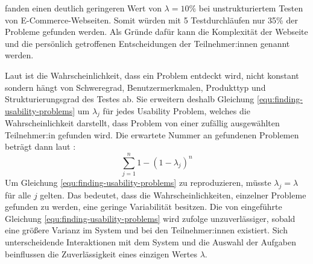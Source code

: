 \textcite{spoolTestingWeb2001} fanden einen deutlich geringeren Wert von $\lambda{}=10\%$ bei unstrukturiertem Testen von E-Commerce-Webseiten. Somit würden mit 5 Testdurchläufen nur 35\% der Probleme gefunden werden. Als Gründe dafür kann die Komplexität der Webseite und die persönlich getroffenen Entscheidungen der Teilnehmer:innen genannt werden.
\parencite{spoolTestingWeb2001}

Laut \textcite{woolrychWhyWhen2001} ist die Wahrscheinlichkeit, dass ein Problem entdeckt wird, nicht konstant sondern hängt von Schweregrad, Benutzermerkmalen, Produkttyp und Strukturierungsgrad des Testes ab. Sie erweitern deshalb Gleichung \ref{equ:finding-usability-problems} um $\lambda{}_j$ für jedes Usability Problem, welches die Wahrscheinlichkeit darstellt, dass Problem von einer zufällig ausgewählten Teilnehmer:in gefunden wird. Die erwartete Nummer an gefundenen Problemen beträgt dann laut \textcite{woolrychWhyWhen2001}:
\begin{equation}
  \sum_{j=1}^n 1-(1-\lambda{}_j)^n
\end{equation}
Um Gleichung \ref{equ:finding-usability-problems} zu reproduzieren, müsste $\lambda{}_j = \lambda{}$ für alle $j$ gelten. Das bedeutet, dass die Wahrscheinlichkeiten, einzelner Probleme gefunden zu werden, eine geringe Variabilität besitzen. Die von \textcite{nielsenMathematicalModel1993} eingeführte Gleichung \ref{equ:finding-usability-problems} wird \textcite{woolrychWhyWhen2001} zufolge unzuverlässiger, sobald eine größere Varianz im System und bei den Teilnehmer:innen existiert. Sich unterscheidende Interaktionen mit dem System und die Auswahl der Aufgaben beinflussen die Zuverlässigkeit eines einzigen Wertes $\lambda{}$.
\parencite{woolrychWhyWhen2001}


